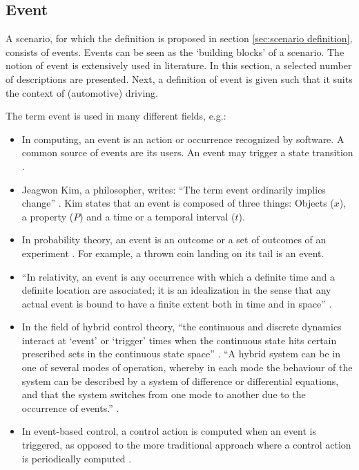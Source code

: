 \subsection{Event}
\label{sec:events}
A scenario, for which the definition is proposed in section \ref{sec:scenario definition}, consists of events. Events can be seen as the `building blocks' of a scenario. The notion of event is extensively used in literature. In this section, a selected number of descriptions are presented. Next, a definition of event is given such that it suits the context of (automotive) driving.

The term event is used in many different fields, e.g.:
\begin{itemize}
	\item In computing, an event is an action or occurrence recognized by software. A common source of events are its users. An event may trigger a state transition \cite{breu1997towards}.
	\item Jeagwon Kim, a philosopher, writes: ``The term event ordinarily implies change'' \cite{kim1993supervenience}. Kim states that an event is composed of three things: Objects ($x$), a property ($P$) and a time or a temporal interval ($t$). 
	\item In probability theory, an event is an outcome or a set of outcomes of an experiment \cite{pfeiffer2013concepts}. For example, a thrown coin landing on its tail is an event.
	\item ``In relativity, an event is any occurrence with which a definite time and a definite location are associated; it is an idealization in the sense that any actual event is bound to have a finite extent both in time and in space'' \cite{sartori1996understanding}.
	\item In the field of hybrid control theory, ``the continuous and discrete dynamics interact at `event' or `trigger' times when the continuous state hits certain prescribed sets in the continuous state space'' \cite{branicky1998hybridcontrol}. ``A hybrid system can be in one of several modes of operation, whereby in each mode the behaviour of the system can be described by a system of difference or differential equations, and that the system switches from one mode to another due to the occurrence of events.'' \cite{deschutter2003hybrid}.
	\item In event-based control, a control action is computed when an event is triggered, as opposed to the more traditional approach where a control action is periodically computed \cite{heemels2012eventcontrol}. 
\end{itemize}

